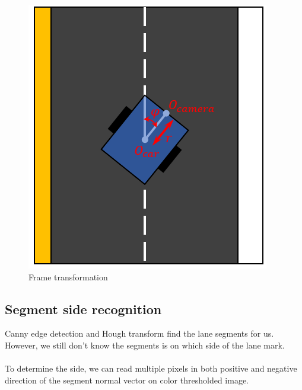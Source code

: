 \documentclass{article}
\begin{document}
\begin{figure}[ht]
  \label{fig:frame_transformation}
  \centering
  \includegraphics[scale=0.7]{graphs/frame_transformation.PNG}
  \caption{Frame transformation}
\end{figure}
\FloatBarrier

\subsection{Segment side recognition}

Canny edge detection and Hough transform find the lane segments for us. However, we still don't know the segments is on which side of the lane mark.
\\
\\
To determine the side, we can read multiple pixels in both positive and negative direction of the segment normal vector on color thresholded image. 
\end{document}
